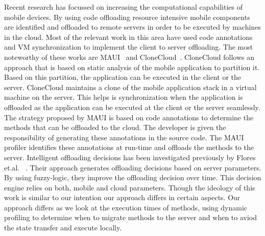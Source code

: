 Recent research has focussed on increasing the computational capabilities of mobile devices. By using code offloading
resource intensive mobile components are identified and offloaded to remote servers in order to be executed
by machines in the cloud. Most of the relevant work in this area have used code annotations and VM synchronization to
implement the client to server offloading. The most noteworthy of these works are MAUI~\cite{maui} and CloneCloud~\cite{ccloud}.
\newline
CloneCloud follows an approach that is based on static analysis of the mobile application to partition it.
Based on this partition, the application can be executed in the client or the server. CloneCloud maintains
a clone of the mobile application stack in a virtual machine on the server. This helps is synchronization
when the application is offloaded as the application can be executed at the client or the server seamlessly.
The strategy proposed by MAUI is based on code annotations to determine the methods that can be offloaded to the
cloud. The developer is given the responsibility of generating these annotations in the source code. The MAUI
profiler identifies these annotations at run-time and offloads the methods to the server.
\newline
Intelligent offloading decisions has been investigated previously by Flores et.al. ~\cite{fuzzy}. Their approach
generates offloading decisions based on server parameters. By using fuzzy-logic, they improve the offloading decision
over time. This decision engine relies on both, mobile and cloud parameters. Though the ideology of this work is similar
to our intention our approach differs in certain aspects. Our approach differs as we look
at the execution times of methods, using dynamic profiling to determine when to migrate methods to the server and when
to aviod the state transfer and execute locally.

